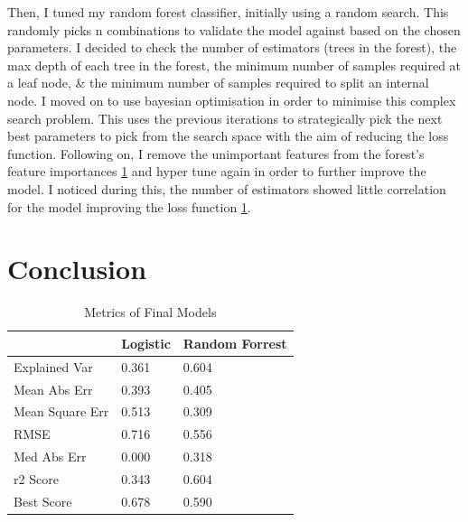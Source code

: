 \documentclass[11pt, a4paper, twocolumn]{article}
\begin{document}
Then, I tuned my random forest classifier, initially using a random search. This randomly picks n combinations to validate the model against based on the chosen parameters.
I decided to check the number of estimators (trees in the forest), the max depth of each tree in the forest, the minimum number of samples required at a leaf node, \& the minimum number of samples required to split an internal node.
I moved on to use bayesian optimisation in order to minimise this complex search problem. This uses the previous iterations to strategically pick the next best parameters to pick from the search space with the aim of reducing the loss function. 
Following on, I remove the unimportant features from the forest's feature importances \ref{} and hyper tune again in order to further improve the model. I noticed during this, the number of estimators showed little correlation for the model improving the loss function \ref{}.  
\section{Conclusion}

\begin{table}[H]
	\centering
	\begin{tabular}{l|l|l|}
	\cline{2-3}
												   & Logistic & Random Forrest \\ \hline
	\multicolumn{1}{|l|}{Explained Var} 		   & 0.361                     & 0.604                           \\ \hline
	\multicolumn{1}{|l|}{Mean Abs Err}       	   & 0.393                     & 0.405                           \\ \hline
	\multicolumn{1}{|l|}{Mean Square Err}          & 0.513                     & 0.309                           \\ \hline
	\multicolumn{1}{|l|}{RMSE}   				   & 0.716                     & 0.556                           \\ \hline
	\multicolumn{1}{|l|}{Med Abs Err}    		   & 0.000                     & 0.318                           \\ \hline
	\multicolumn{1}{|l|}{r2 Score}                 & 0.343                     & 0.604                           \\ \hline
	\multicolumn{1}{|l|}{Best Score}               & 0.678                     & 0.590                           \\ \hline
	\end{tabular}
	\caption{Metrics of Final Models}
	\label{table:metrics}
\end{table}
\end{document}
